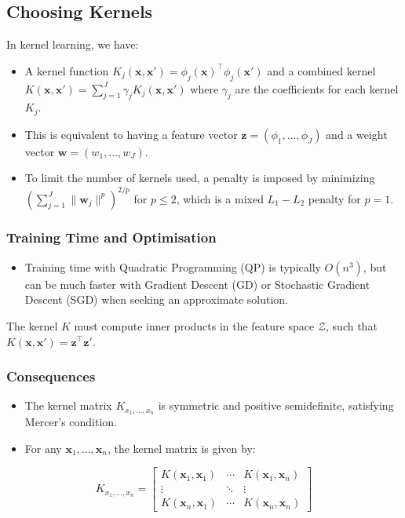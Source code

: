 \subsection{Choosing Kernels}
In kernel learning, we have:
\begin{itemize}
    \item A kernel function \( K_j(\mathbf{x}, \mathbf{x}') = \phi_j(\mathbf{x})^\top \phi_j(\mathbf{x}') \) and a combined kernel \( K(\mathbf{x}, \mathbf{x}') = \sum_{j=1}^{J} \gamma_j K_j(\mathbf{x}, \mathbf{x}') \) where \( \gamma_j \) are the coefficients for each kernel \( K_j \).
    \item This is equivalent to having a feature vector \( \mathbf{z} = (\phi_1, \ldots, \phi_J) \) and a weight vector \( \mathbf{w} = (w_1, \ldots, w_J) \).
    \item To limit the number of kernels used, a penalty is imposed by minimizing \(\left( \sum_{j=1}^{J} \|\mathbf{w}_j\|^p \right)^{2/p}\) for \( p \leq 2 \), which is a mixed \( L_1-L_2 \) penalty for \( p = 1 \).
\end{itemize}

\subsubsection*{Training Time and Optimisation}
\begin{itemize}
    \item Training time with Quadratic Programming (QP) is typically \( O(n^3) \), but can be much faster with Gradient Descent (GD) or Stochastic Gradient Descent (SGD) when seeking an approximate solution.
\end{itemize}

The kernel \( K \) must compute inner products in the feature space \( \mathcal{Z} \), such that \( K(\mathbf{x}, \mathbf{x}') = \mathbf{z}^\top \mathbf{z}' \).

\subsubsection*{Consequences}
\begin{itemize}
    \item The kernel matrix \( K_{x_1,\ldots,x_n} \) is symmetric and positive semidefinite, satisfying Mercer's condition.
    \item For any \( \mathbf{x}_1, \ldots, \mathbf{x}_n \), the kernel matrix is given by:
\end{itemize}
\begin{equation}
K_{x_1,\ldots,x_n} = 
\begin{bmatrix}
K(\mathbf{x}_1, \mathbf{x}_1) & \cdots & K(\mathbf{x}_1, \mathbf{x}_n) \\
\vdots & \ddots & \vdots \\
K(\mathbf{x}_n, \mathbf{x}_1) & \cdots & K(\mathbf{x}_n, \mathbf{x}_n)
\end{bmatrix}
\end{equation}


